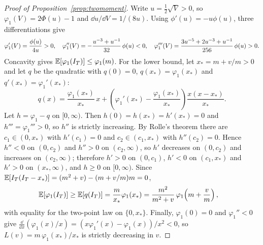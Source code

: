 \begin{proof}[Proof of Proposition~\ref{prop:twomoment}]
Write $u=\tfrac12\sqrt{V}>0$, so $\varphi_1(V)=2\Phi(u)-1$ and $\dd u/\dd V=1/(8u)$. Using $\phi'(u)=-u\phi(u)$, three differentiations give
\[
  \begin{gathered}
  \varphi_1'(V) = \frac{\phi(u)}{4u} > 0,
  \quad
  \varphi_1''(V) = -\frac{u^{-3}+u^{-1}}{32}\,\phi(u) < 0,
  \quad
  \varphi_1'''(V) = \frac{3u^{-5}+2u^{-3}+u^{-1}}{256}\,\phi(u) > 0.
  \end{gathered}
\]
Concavity gives $\mathbb{E}[\varphi_1(I_T)]\le\varphi_1(m)$. For the lower bound, let $x_*=m+v/m>0$ and let $q$ be the quadratic with $q(0)=0$, $q(x_*)=\varphi_1(x_*)$ and $q'(x_*)=\varphi_1'(x_*)$:
\[
  q(x) = \frac{\varphi_1(x_*)}{x_*}\,x + \left(\varphi_1'(x_*)-\frac{\varphi_1(x_*)}{x_*}\right)\frac{x(x-x_*)}{x_*}.
\]
Let $h=\varphi_1-q$ on $[0,\infty)$. Then $h(0)=h(x_*)=h'(x_*)=0$ and $h'''=\varphi_1'''>0$, so $h''$ is strictly increasing. By Rolle's theorem there are $c_1\in(0,x_*)$ with $h'(c_1)=0$ and $c_2\in(c_1,x_*)$ with $h''(c_2)=0$. Hence $h''<0$ on $(0,c_2)$ and $h''>0$ on $(c_2,\infty)$, so $h'$ decreases on $(0,c_2)$ and increases on $(c_2,\infty)$; therefore $h'>0$ on $(0,c_1)$, $h'<0$ on $(c_1,x_*)$ and $h'>0$ on $(x_*,\infty)$, and $h\ge 0$ on $[0,\infty)$. Since $\mathbb{E}[I_T(I_T-x_*)]=(m^2+v)-(m+v/m)m=0$,
\[
  \begin{aligned}
  \mathbb{E}[\varphi_1(I_T)] &\ge \mathbb{E}[q(I_T)] = \frac{m}{x_*}\varphi_1(x_*)  = \frac{m^2}{m^2+v}\,\varphi_1\!\left(m+\frac{v}{m}\right),
  \end{aligned}
\]
with equality for the two-point law on $\{0,x_*\}$. Finally, $\varphi_1(0)=0$ and $\varphi_1''<0$ give $\frac{\dd}{\dd x}(\varphi_1(x)/x)=(x\varphi_1'(x)-\varphi_1(x))/x^2<0$, so $L(v)=m\,\varphi_1(x_*)/x_*$ is strictly decreasing in $v$.
\end{proof}

